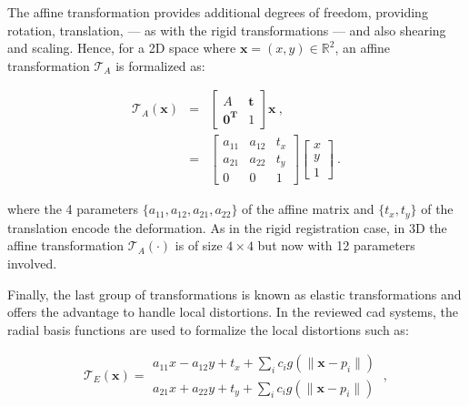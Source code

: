 \begin{enumerate}[leftmargin=*]
The affine transformation provides additional degrees of freedom, providing
rotation, translation, --- as with the rigid transformations --- and also
shearing and scaling.
Hence, for a 2D space where $\mathbf{x} = (x,y) \in \mathbb{R}^2$, an affine
transformation $\mathcal{T}_A$ is formalized as:

\begin{eqnarray}
  \mathcal{T}_A(\mathbf{x}) & = & \begin{bmatrix}
    A & \mathbf{t} \\
    \mathbf{0^T} & 1
  \end{bmatrix} \mathbf{x} \ , \nonumber \\
                            & = & \begin{bmatrix}
                              a_{11} & a_{12} & t_x \\
                              a_{21} & a_{22} & t_y \\
                              0 & 0 & 1
                            \end{bmatrix}\begin{bmatrix}
                              x \\
                              y \\
                              1
                            \end{bmatrix} \ . \label{eq:afftra}%
\end{eqnarray}

\noindent where the 4 parameters $\{a_{11},a_{12},a_{21},a_{22}\}$ of the
affine matrix and $\{ t_x, t_y \}$ of the translation encode the deformation.
As in the rigid registration case, in 3D the affine transformation
$\mathcal{T}_A(\cdot)$ is of size $4 \times 4$ but now with 12 parameters
involved.

Finally, the last group of transformations is known as elastic transformations
and offers the advantage to handle local distortions.
In the reviewed \ac{cad} systems, the radial basis functions are used to
formalize the local distortions such as:

\begin{equation}
  \mathcal{T}_E(\mathbf{x}) = \begin{matrix}
    a_{11} x - a_{12} y + t_x + \sum_i c_i g(\| \mathbf{x} - p_i \|) \\
    a_{21} x + a_{22} y + t_y + \sum_i c_i g(\| \mathbf{x} - p_i \|)
  \end{matrix} \ ,
\end{equation}


\end{enumerate}
